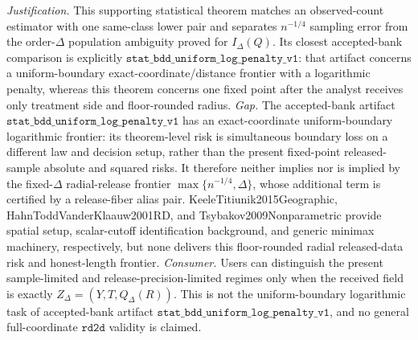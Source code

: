 \documentclass{article}
\begin{document}
\par\smallskip\noindent \textit{Justification.} This supporting statistical theorem matches an observed-count estimator with one same-class lower pair and separates \(n^{-1/4}\) sampling error from the order-\(\Delta\) population ambiguity proved for \(I_\Delta(Q)\). Its closest accepted-bank comparison is explicitly \(\texttt{stat\_bdd\_uniform\_log\_penalty\_v1}\): that artifact concerns a uniform-boundary exact-coordinate/distance frontier with a logarithmic penalty, whereas this theorem concerns one fixed point after the analyst receives only treatment side and floor-rounded radius. \textit{Gap.} The accepted-bank artifact \(\texttt{stat\_bdd\_uniform\_log\_penalty\_v1}\) has an exact-coordinate uniform-boundary logarithmic frontier: its theorem-level risk is simultaneous boundary loss on a different law and decision setup, rather than the present fixed-point released-sample absolute and squared risks. It therefore neither implies nor is implied by the fixed-\(\Delta\) radial-release frontier \(\max\{n^{-1/4},\Delta\}\), whose additional term is certified by a release-fiber alias pair. KeeleTitiunik2015Geographic, HahnToddVanderKlaauw2001RD, and Tsybakov2009Nonparametric provide spatial setup, scalar-cutoff identification background, and generic minimax machinery, respectively, but none delivers this floor-rounded radial released-data risk and honest-length frontier. \textit{Consumer.} Users can distinguish the present sample-limited and release-precision-limited regimes only when the received field is exactly \(Z_\Delta=(Y,T,Q_\Delta(R))\). This is not the uniform-boundary logarithmic task of accepted-bank artifact \(\texttt{stat\_bdd\_uniform\_log\_penalty\_v1}\), and no general full-coordinate \(\texttt{rd2d}\) validity is claimed.
\end{document}
